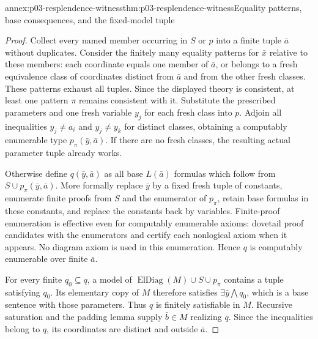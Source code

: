 \begin{annexitem}{annex:p03-resplendence-witness}{thm:p03-resplendence-witness}{Equality patterns, base consequences, and the fixed-model tuple}
\begin{proof}
Collect every named member occurring in \(S\) or \(p\) into a finite
tuple \(\bar a\) without duplicates. Consider the finitely many equality
patterns for \(\bar x\) relative to these members: each coordinate equals
one member of \(\bar a\), or belongs to a fresh equivalence class of
coordinates distinct from \(\bar a\) and from the other fresh classes.
These patterns exhaust all tuples. Since the displayed theory is
consistent, at least one pattern \(\pi\) remains consistent with it.
Substitute the prescribed parameters and one fresh variable \(y_j\)
for each fresh class into \(p\). Adjoin all inequalities
\(y_j\ne a_i\) and \(y_j\ne y_k\) for distinct classes, obtaining
a computably enumerable type \(p_\pi(\bar y,\bar a)\). If there are
no fresh classes, the resulting actual parameter tuple already works.

Otherwise define \(q(\bar y,\bar a)\) as all base \(L(\bar a)\)
formulas which follow from \(S\cup p_\pi(\bar y,\bar a)\). More
formally replace \(\bar y\) by a fixed fresh tuple of constants, enumerate
finite proofs from \(S\) and the enumerator of \(p_\pi\), retain base
formulas in these constants, and replace the constants back by variables.
Finite-proof enumeration is effective even for computably enumerable
axioms: dovetail proof candidates with the enumerators and certify each
nonlogical axiom when it appears. No diagram axiom is used in this
enumeration. Hence \(q\) is computably enumerable over finite \(\bar a\).

For every finite \(q_0\subseteq q\), a model of
\(\operatorname{ElDiag}(M)\cup S\cup p_\pi\) contains a tuple
satisfying \(q_0\). Its elementary copy of \(M\) therefore satisfies
\(\exists\bar y\bigwedge q_0\), which is a base sentence with those
parameters. Thus \(q\) is finitely satisfiable in \(M\). Recursive
saturation and the padding lemma supply \(\bar b\in M\) realizing
\(q\). Since the inequalities belong to \(q\), its coordinates are
distinct and outside \(\bar a\).


\end{proof}
\end{annexitem}
